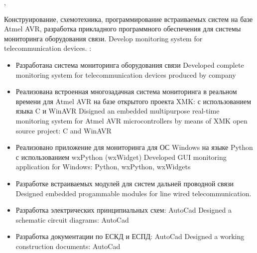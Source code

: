 \documentclass[11pt,a4paper,sans]{moderncv}        %
\begin{document}
{\designengineer}
{\protect{}}
{\cityperm, \country}{}
{
{Конструирование, схемотехника, программирование встраиваемых систем на базе Atmel AVR, разработка прикладного программного обеспечения для системы мониторинга оборудования связи.}
{Develop monitoring system for telecommunication devices.}\newline{}
\achievements:
\begin{itemize}
	\item {}
		{Разработана система мониторинга оборудования связи}
		{Developed complete monitoring system for telecommunication devices produced by company }
	\item {}
		{Реализована встроенная многозадачная система мониторинга в реальном времени для Atmel AVR на базе открытого проекта XMK: с использованием языка C и WinAVR}
		{Disigned an embedded multipurpose real-time monitoring system for Atmel AVR microcontrollers by means of XMK open source project: C and WinAVR}
	\item {}
		{Реализовано приложение для мониторинга для ОС Windows на языке Python с использованием wxPython (wxWidget)}
		{Developed GUI monitoring application for Windows: Python, wxPython, wxWidgets}
	\item {}
		{Разработке встраиваемых модулей для систем дальней проводной связи}
		{Designed embedded progammable modules for line wired telecommunication.}
	\item {}
		{Разработка электрических принципиальных схем: AutoCad}
		{Designed a schematic circuit diagrams: AutoCad}
	\item {}
		{Разработка документации по ЕСКД и ЕСПД: AutoCad}
		{Designed a working construction documents: AutoCad}
\end{itemize}
}
\end{document}
